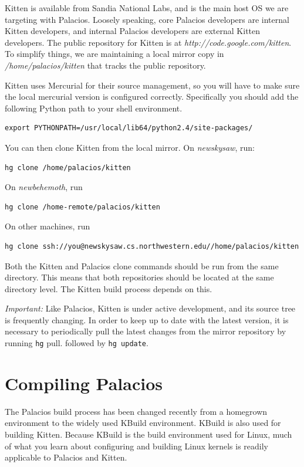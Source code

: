 \documentclass[11pt]{article}
\begin{document}
Kitten is available from Sandia National Labs, and is the main host OS
we are targeting with Palacios. Loosely speaking, core Palacios
developers are internal Kitten developers, and internal Palacios
developers are external Kitten developers. The public repository for
Kitten is at {\em http://code.google.com/kitten}.  To simplify things,
we are maintaining a local mirror copy in {\em /home/palacios/kitten}
that tracks the public repository.

Kitten uses Mercurial for their source management, so you will have to
make sure the local mercurial version is configured correctly.
Specifically you should add the following Python path to your shell environment.

\begin{verbatim}
export PYTHONPATH=/usr/local/lib64/python2.4/site-packages/
\end{verbatim}

You can then clone Kitten from the local mirror.   On {\em newskysaw},
run: 
\begin{verbatim}
hg clone /home/palacios/kitten
\end{verbatim}
On {\em newbehemoth}, run
\begin{verbatim}
hg clone /home-remote/palacios/kitten
\end{verbatim}
On other machines, run
\begin{verbatim}
hg clone ssh://you@newskysaw.cs.northwestern.edu//home/palacios/kitten
\end{verbatim}


Both the Kitten and Palacios clone commands should be run from the
same directory. This means that both repositories should be located at
the same directory level. The Kitten build process depends on this.

{\em Important:} Like Palacios, Kitten is under active development,
and its source tree is frequently changing. In order to keep up to
date with the latest version, it is necessary to periodically pull the
latest changes from the mirror repository by running \verb.hg.
pull. followed by \verb.hg update..

\section{Compiling Palacios}

The Palacios build process has been changed recently from a homegrown
environment to the widely used KBuild environment.  KBuild is also
used for building Kitten.  Because KBuild is the build environment
used for Linux, much of what you learn about configuring and building
Linux kernels is readily applicable to Palacios and Kitten. 
\end{document}
